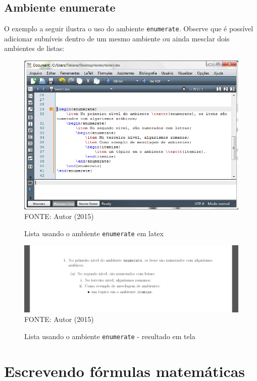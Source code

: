 \subsection{Ambiente enumerate}

O exemplo a seguir ilustra o uso do ambiente \texttt{enumerate}. Observe que é possível adicionar subníveis dentro de um mesmo ambiente ou ainda mesclar dois ambientes de listas:
	\begin{figure}[H]
	\centering
	\caption{Lista usando o ambiente \texttt{enumerate} em latex}
	\includegraphics[scale=0.5]
	{img/fig05.png}\label{fig05}\\
	FONTE: Autor (2015)
	\end{figure}

	\begin{figure}[H]
	\centering
	\caption{Lista usando o ambiente \texttt{enumerate} - resultado em tela}
	\includegraphics[scale=0.4]
	{img/fig06.png}\label{fig06}\\
	FONTE: Autor (2015)
	\end{figure}


\section{Escrevendo fórmulas matemáticas}

